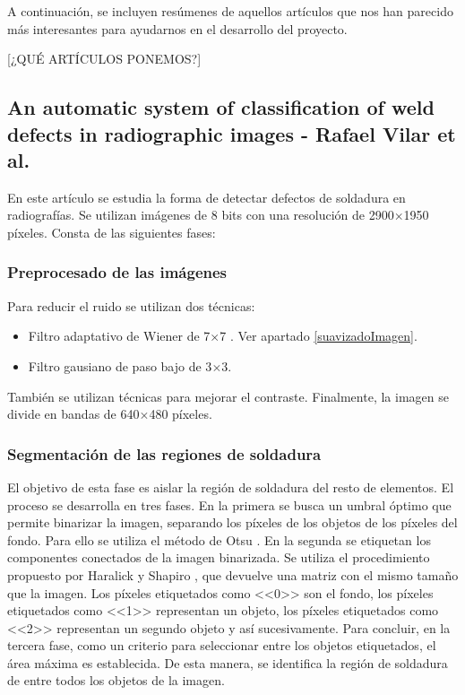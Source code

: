 A continuación, se incluyen resúmenes de aquellos artículos que nos han parecido más interesantes para ayudarnos en el desarrollo del proyecto.

[¿QUÉ ARTÍCULOS PONEMOS?]


\subsection{An automatic system of classification of weld defects in radiographic images - Rafael Vilar et al.}
En este artículo \cite{vilar2009automatic} se estudia la forma de detectar defectos de soldadura en radiografías. Se utilizan imágenes de 8 bits con una resolución de 2900$\times$1950 píxeles. Consta de las siguientes fases:


\subsubsection{Preprocesado de las imágenes}
Para reducir el ruido se utilizan dos técnicas:
	\begin{itemize}
	\item Filtro adaptativo de Wiener de 7$\times$7 \cite{wiener1949extrapolation}. Ver apartado \ref{suavizadoImagen}.
	\item Filtro gausiano de paso bajo de 3$\times$3.
	\end{itemize}
También se utilizan técnicas para mejorar el contraste.
Finalmente, la imagen se divide en bandas de 640$\times$480 píxeles. 


\subsubsection{Segmentación de las regiones de soldadura}
El objetivo de esta fase es aislar la región de soldadura del resto de elementos. El proceso se desarrolla en tres fases. 
En la primera se busca un umbral óptimo que permite binarizar la imagen, separando los píxeles de los objetos de los píxeles del fondo. Para ello se utiliza el método de Otsu \cite{otsu1979threshold}.
En la segunda se etiquetan los componentes conectados de la imagen binarizada. Se utiliza el procedimiento propuesto por Haralick y Shapiro \cite{haralick1992computer}, que devuelve una matriz con el mismo tamaño que la imagen. Los píxeles etiquetados como <<0>> son el fondo, los píxeles etiquetados como <<1>> representan un objeto, los píxeles etiquetados como <<2>> representan un segundo objeto y así sucesivamente.
Para concluir, en la tercera fase, como un criterio para seleccionar entre los objetos etiquetados, el área máxima es establecida. De esta manera, se identifica la región de soldadura de entre todos los objetos de la imagen.



